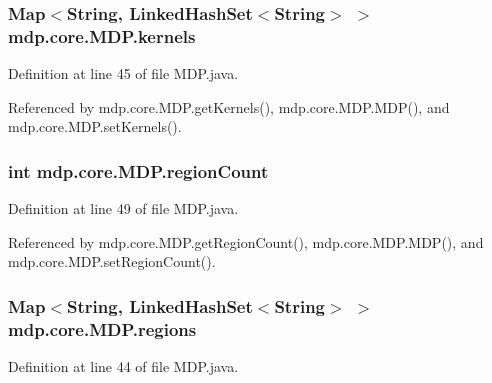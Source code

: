 \subsubsection[{kernels}]{\setlength{\rightskip}{0pt plus 5cm}Map$<$String, Linked\+Hash\+Set$<$String$>$ $>$ mdp.\+core.\+M\+D\+P.\+kernels\hspace{0.3cm}{\ttfamily [private]}}\label{classmdp_1_1core_1_1_m_d_p_ac185a95b0c9eb78b9d5a00b214696191}


Definition at line 45 of file M\+D\+P.\+java.



Referenced by mdp.\+core.\+M\+D\+P.\+get\+Kernels(), mdp.\+core.\+M\+D\+P.\+M\+D\+P(), and mdp.\+core.\+M\+D\+P.\+set\+Kernels().

\hypertarget{classmdp_1_1core_1_1_m_d_p_ae2644b9387e09a5c2ab096c0bb519f8d}{}
\subsubsection[{region\+Count}]{\setlength{\rightskip}{0pt plus 5cm}int mdp.\+core.\+M\+D\+P.\+region\+Count\hspace{0.3cm}{\ttfamily [private]}}\label{classmdp_1_1core_1_1_m_d_p_ae2644b9387e09a5c2ab096c0bb519f8d}


Definition at line 49 of file M\+D\+P.\+java.



Referenced by mdp.\+core.\+M\+D\+P.\+get\+Region\+Count(), mdp.\+core.\+M\+D\+P.\+M\+D\+P(), and mdp.\+core.\+M\+D\+P.\+set\+Region\+Count().

\hypertarget{classmdp_1_1core_1_1_m_d_p_a79761e7b3bb0d7a083bee7183c992893}{}
\subsubsection[{regions}]{\setlength{\rightskip}{0pt plus 5cm}Map$<$String, Linked\+Hash\+Set$<$String$>$ $>$ mdp.\+core.\+M\+D\+P.\+regions\hspace{0.3cm}{\ttfamily [private]}}\label{classmdp_1_1core_1_1_m_d_p_a79761e7b3bb0d7a083bee7183c992893}


Definition at line 44 of file M\+D\+P.\+java.



